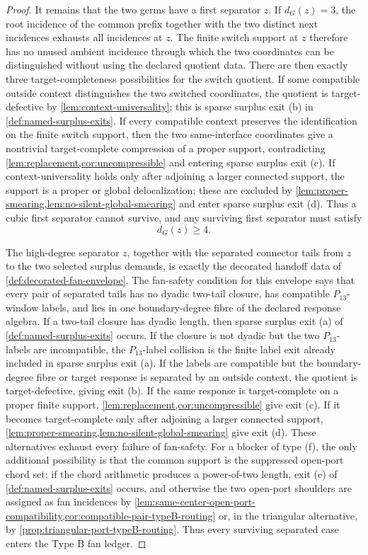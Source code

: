 \documentclass[11pt]{article}
\begin{document}
\begin{proof}
It remains that the two germs have a first separator \(z\).  If \(d_G(z)=3\),
the root incidence of the common prefix together with the two distinct next
incidences exhausts all incidences at \(z\).  The finite switch support at
\(z\) therefore has no unused ambient incidence through which the two
coordinates can be distinguished without using the declared quotient data.
There are then exactly three target-completeness possibilities for the switch
quotient.  If some compatible outside context distinguishes the two switched
coordinates, the quotient is target-defective by
\cref{lem:context-universality}; this is sparse surplus exit (b) in
\cref{def:named-surplus-exits}.  If every compatible context preserves the
identification on the finite switch support, then the two same-interface
coordinates give a nontrivial target-complete compression of a proper support,
contradicting \cref{lem:replacement,cor:uncompressible} and entering sparse
surplus exit (c).  If context-universality holds only after adjoining a larger
connected support, the support is a proper or global delocalization; these are
excluded by \cref{lem:proper-smearing,lem:no-silent-global-smearing} and enter
sparse surplus exit (d).  Thus a cubic first separator cannot survive, and any
surviving first separator must satisfy
\[
d_G(z)\ge4 .
\]

The high-degree separator \(z\), together with the separated connector tails
from \(z\) to the two selected surplus demands, is exactly the decorated handoff
data of \cref{def:decorated-fan-envelope}.  The fan-safety condition for this
envelope says that every pair of separated tails has no dyadic two-tail closure,
has compatible \(P_{13}\)-window labels, and lies in one boundary-degree fibre
of the declared response algebra.  If a two-tail closure has dyadic length,
then sparse surplus exit (a) of \cref{def:named-surplus-exits} occurs.  If the
closure is not dyadic but the two \(P_{13}\)-labels are incompatible, the
\(P_{13}\)-label collision is the finite label exit already included in sparse
surplus exit (a).  If the labels are compatible but the boundary-degree fibre
or target response is separated by an outside context, the quotient is
target-defective, giving exit (b).  If the same response is target-complete on
a proper finite support, \cref{lem:replacement,cor:uncompressible} give exit
(c).  If it becomes target-complete only after adjoining a larger connected
support, \cref{lem:proper-smearing,lem:no-silent-global-smearing} give exit
(d).  These alternatives exhaust every failure of fan-safety.  For a blocker of
type (f), the only additional possibility is that the common support is the
suppressed open-port chord set; if the chord arithmetic produces a power-of-two
length, exit (e) of \cref{def:named-surplus-exits} occurs, and otherwise the two
open-port shoulders are assigned as fan incidences by
\cref{lem:same-center-open-port-compatibility,cor:compatible-pair-typeB-routing}
or, in the triangular alternative, by
\cref{prop:triangular-port-typeB-routing}.  Thus every surviving separated
case enters the Type B fan ledger.
\end{proof}
\end{document}
